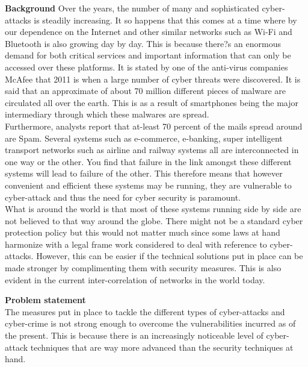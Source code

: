 \documentclass[10pt,a4paper]{report}
\begin{document}
\begin{flushleft}
	\textbf{Background
	}\linebreak[4]
	Over the years, the number of many and sophisticated cyber-attacks is steadily increasing. It so happens that this comes at a time where by our dependence on the Internet and other similar networks such as Wi-Fi and Bluetooth is also growing day by day. This is because there?s an enormous demand for both critical services and important information that can only be accessed over these platforms. It is stated by one of the anti-virus companies McAfee that 2011 is when a large number of cyber threats were discovered. It is said that an approximate of about 70 million different pieces of malware are circulated all over the earth. This is as a result of smartphones being the major intermediary through which these malwares are spread.\\
	
	
	Furthermore, analysts report that at-least 70 percent of the mails spread around are Spam. Several systems such as e-commerce, e-banking, super intelligent transport networks such as airline and railway systems all are interconnected in one way or the other. You find that failure in the link amongst these different systems will lead to failure of the other. This therefore means that however convenient and efficient these systems may be running, they are vulnerable to cyber-attack and thus the need for cyber security is paramount.\\
	
	
	What is around the world is that most of these systems running side by side are not believed to that way around the globe. There might not be a standard cyber protection policy but this would not matter much since some laws at hand harmonize with a legal frame work considered to deal with reference to cyber-attacks. However, this can be easier if the technical solutions put in place can be made stronger by complimenting them with security measures. This is also evident in the current inter-correlation of networks in the world today.\linebreak[5]
	
	
	
	
	
	\textbf{Problem statement}\\
	
	
	The measures put in place to tackle the different types of cyber-attacks and cyber-crime is not strong enough to overcome the vulnerabilities incurred as of the present. This is because there is an increasingly noticeable level of cyber-attack techniques that are way more advanced than the security techniques at hand.\\
	

\end{flushleft}
\end{document}
